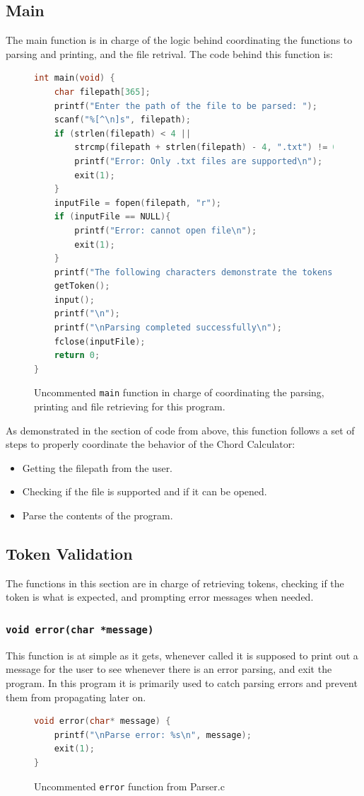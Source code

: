 \documentclass{article}
\begin{document}
\subsection{Main}
The main function is in charge of the logic behind coordinating the functions to parsing and printing, and the file retrival. The code behind this function is:
\begin{figure}[H]
    \begin{lstlisting}[language=C]
int main(void) {
    char filepath[365];
    printf("Enter the path of the file to be parsed: ");
    scanf("%[^\n]s", filepath);
    if (strlen(filepath) < 4 || 
        strcmp(filepath + strlen(filepath) - 4, ".txt") != 0) {
        printf("Error: Only .txt files are supported\n");
        exit(1);
    }
    inputFile = fopen(filepath, "r");
    if (inputFile == NULL){
        printf("Error: cannot open file\n");
        exit(1);
    }
    printf("The following characters demonstrate the tokens being parsed.\n\n");
    getToken();
    input();
    printf("\n");
    printf("\nParsing completed successfully\n");
    fclose(inputFile);
    return 0;
}
    \end{lstlisting}
    \caption{Uncommented \texttt{main} function in charge of coordinating the parsing, printing and file retrieving for this program.}
    \label{fig:MainFunc}
\end{figure}
As demonstrated in the section of code from above, this function follows a set of steps to properly coordinate the behavior of the Chord Calculator:
\begin{itemize}
    \item Getting the filepath from the user.
    \item Checking if the file is supported and if it can be opened.
    \item Parse the contents of the program.
\end{itemize}
\subsection{Token Validation}
The functions in this section are in charge of retrieving tokens, checking if the token is what is expected, and prompting error messages when needed. 
\subsubsection{\texttt{void error(char *message)}}
This function is at simple as it gets, whenever called it is supposed to print out a message for the user to see whenever there is an error parsing, and exit the program. In this program it is primarily used to catch parsing errors and prevent them from propagating later on.
\begin{figure}[H]
    \begin{lstlisting}[language=C]
void error(char* message) {
    printf("\nParse error: %s\n", message);
    exit(1);
}
    \end{lstlisting}
    \caption{Uncommented \texttt{error} function from Parser.c}
\end{figure}
\end{document}
